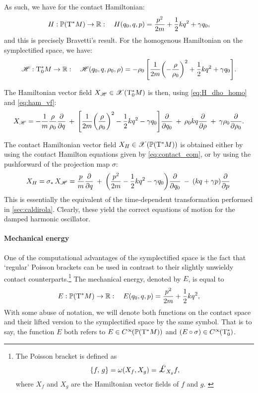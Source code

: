 As such, we have for the contact Hamiltonian:
\begin{equation}
    H: \mathbb{P}\qty(\mathrm{T}^*M) \to \mathbb{R}: \quad H(q_0, q, p) = \frac{p^2}{2m} + \frac{1}{2}kq^2 + \gamma q_0,
    \label{eq:H_dho}
\end{equation}
and this is precisely Bravetti's result. For the homogenous Hamiltonian on the symplectified space, we have:
\begin{equation}
    \mathscr{H}: \mathrm{T}^*_0M \to \mathbb{R}: \quad \mathscr{H}(q_0, q, \rho_0, \rho) = -\rho_0\,\qty[\frac{1}{2m}\qty(-\frac{\rho}{\rho_0})^2 + \frac{1}{2}kq^2 + \gamma q_0]. 
    \label{eq:H_dho_homo}
\end{equation}

The Hamiltonian vector field $X_\mathscr{H} \in \mathscr{X}\qty(\mathrm{T}^*_0M)$ is then, using \cref{eq:H_dho_homo} and \cref{eq:ham_vf}:
$$ X_{\mathscr{H}} = -\frac{1}{m}\frac{\rho}{\rho_0}\pdv{}{q}\: + \: \qty[\frac{1}{2m}\qty(\frac{\rho}{\rho_0})^2 - \frac{1}{2}kq^2 - \gamma q_0]\pdv{}{q_0}\: + \: \rho_0 kq \pdv{}{\rho}\: + \: \gamma \rho_0 \pdv{}{\rho_0}.$$ 

The contact Hamiltonian vector field $X_H \in \mathscr{X}\qty(\mathbb{P}\qty(\mathrm{T}^*M))$ is obtained either by using the contact Hamilton equations given by \cref{eq:contact_eom}, or by using the pushforward of the projection map $\sigma$:
$$ X_H = \sigma_*\,X_\mathscr{H} = \frac{p}{m}\pdv{}{q}\: + \: \qty(\frac{p^2}{2m} - \frac{1}{2}kq^2 - \gamma q_0)\pdv{}{q_0}\: - \: (kq + \gamma p)\pdv{}{p}\: $$
This is essentially the equivalent of the time-dependent transformation performed in \cref{sec:caldirola}. Clearly, these yield the correct equations of motion for the damped harmonic oscillator.

\paragraph{Mechanical energy} One of the computational advantages of the symplectified space is the fact that `regular' Poisson brackets can be used in contrast to their slightly unwieldy contact counterparts.\footnote
{The Poisson bracket is defined as 
    $$ \poisson{f}{g} = \omega(X_f, X_g) = \lied{X_g}{f},$$
 where $X_f$ and $X_g$ are the Hamiltonian vector fields of $f$ and $g$. \cite{Libermann1987}
} 
The mechanical energy, denoted by $E$, is equal to 
$$ E: \mathbb{P}\qty(\mathrm{T}^*M) \to \mathbb{R}: \quad E(q_0, q, p) = \frac{p^2}{2m} + \frac{1}{2}kq^2,$$
With some abuse of notation, we will denote both functions on the contact space and their lifted version to the symplectified space by the same symbol. That is to say, the function $E$ both refers to $E \in C^\infty\!\qty(\mathbb{P}\qty(\mathrm{T}^*M))$ and $(E \circ \sigma) \in C^\infty\!\qty(\mathrm{T}^*_0)$.

